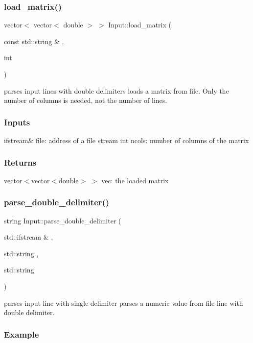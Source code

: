 \subsubsection{\texorpdfstring{load\_matrix()}{load\_matrix()}}
{\footnotesize\ttfamily vector$<$ vector$<$ double $>$ $>$ Input\+::load\+\_\+matrix (\begin{DoxyParamCaption}\item[{const std\+::string \&}]{,  }\item[{int}]{ }\end{DoxyParamCaption})}

parses input lines with double delimiters loads a matrix from file. Only the number of columns is needed, not the number of lines.

\subsubsection*{Inputs }

ifstream\& file\+: address of a file stream int ncols\+: number of columns of the matrix

\subsubsection*{Returns }

vector$<$vector$<$double$>$ $>$ vec\+: the loaded matrix\mbox{\label{class_input_a8c76cad0ed10a1ab30f81368013e7a49}} 
\subsubsection{\texorpdfstring{parse\_double\_delimiter()}{parse\_double\_delimiter()}}
{\footnotesize\ttfamily string Input\+::parse\+\_\+double\+\_\+delimiter (\begin{DoxyParamCaption}\item[{std\+::ifstream \&}]{,  }\item[{std\+::string}]{,  }\item[{std\+::string}]{ }\end{DoxyParamCaption})}

parses input line with single delimiter parses a numeric value from file line with double delimiter.

\subsubsection*{Example }

